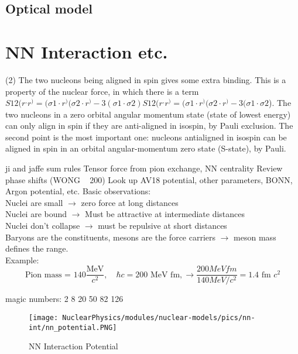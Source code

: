     \section{Optical model}
\chapter{NN Interaction etc.}


(2) The two nucleons being aligned in spin gives some extra binding. This is a property of the nuclear force, in which there is a term
$S12(r^,r^)=(σ1⋅r^)(σ2⋅r^)−3(σ1⋅σ2)S12(r^,r^)=(σ1⋅r^)(σ2⋅r^)−3(σ1⋅σ2$).
The two nucleons in a zero orbital angular momentum state (state of lowest energy) can only align in spin if they are anti-aligned in isospin, by Pauli exclusion.
The second point is the most important one: nucleons antialigned in isospin can be aligned in spin in an orbital angular-momentum zero state (S-state), by Pauli. 



ji and jaffe sum rules
Tensor force from pion exchange, NN centrality
Review phase shifts (WONG ~ 200)
Look up AV18 potential, other parameters, BONN, Argon potential, etc. 
    Basic observations:\\
    Nuclei are small $\longrightarrow$ zero force at long distances\\
    Nuclei are bound $\longrightarrow$ Must be attractive at intermediate distances\\
    Nuclei don't collapse $\longrightarrow$ must be repulsive at short distances\\
    
    Baryons are the constituents, mesons are the force carriers $\xrightarrow{}$ meson mass defines the range.\\
    Example:
    \begin{equation}
        \text{Pion mass = } 140 \frac{\text{MeV}}{c^2},\quad \hbar c = 200 \text{ MeV fm}, \longrightarrow \frac{200 MeV fm}{140 MeV / c^2} = 1.4 \text{ fm $c^2$}
    \end{equation}
    
    magic numbers: 2 8 20 50 82 126
    
    \begin{figure}[H]
        \centering
        \texttt{[image: NuclearPhysics/modules/nuclear-models/pics/nn-int/nn\_potential.PNG]}
        \caption{NN Interaction Potential}
    \end{figure}
    

